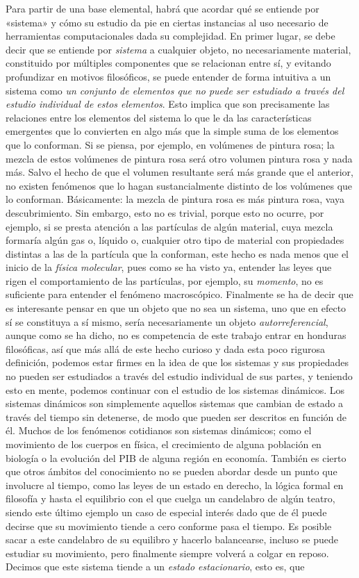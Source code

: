 Para partir de una base elemental, habrá que acordar qué se entiende por «sistema» y cómo su estudio da pie en ciertas instancias al uso necesario de herramientas computacionales dada su complejidad. En primer lugar, se debe decir que se entiende por \textit{sistema} a cualquier objeto, no necesariamente material, constituido por múltiples componentes que se relacionan entre sí, y evitando profundizar en motivos filosóficos, se puede entender de forma intuitiva a un sistema como \textit{un conjunto de elementos que no puede ser estudiado a través del estudio individual de estos elementos}. Esto implica que son precisamente las relaciones entre los elementos del sistema lo que le da las características emergentes que lo convierten en algo más que la simple suma de los elementos que lo conforman. Si se piensa, por ejemplo, en volúmenes de pintura rosa; la mezcla de estos volúmenes de pintura rosa será otro volumen pintura rosa y nada más. Salvo el hecho de que el volumen resultante será más grande que el anterior, no existen fenómenos que lo hagan sustancialmente distinto de los volúmenes que lo conforman. Básicamente: la mezcla de pintura rosa es más pintura rosa, vaya descubrimiento. Sin embargo, esto no es trivial, porque esto no ocurre, por ejemplo, si se presta atención a las partículas de algún material, cuya mezcla formaría algún gas o, líquido o, cualquier otro tipo de material con propiedades distintas a las de la partícula que la conforman, este hecho es nada menos que el inicio de la \textit{física molecular}, pues como se ha visto ya, entender las leyes que rigen el comportamiento de las partículas, por ejemplo, su \textit{momento}, no es suficiente para entender el fenómeno macroscópico. Finalmente se ha de decir que es interesante pensar en que un objeto que no sea un sistema, uno que en efecto sí se constituya a sí mismo, sería necesariamente un objeto \textit{autorreferencial}, aunque como se ha dicho, no es competencia de este trabajo entrar en honduras filosóficas, así que más allá de este hecho curioso y dada esta poco rigurosa definición, podemos estar firmes en la idea de que los sistemas y sus propiedades no pueden ser estudiados a través del estudio individual de sus partes, y teniendo esto en mente, podemos continuar con el estudio de los sistemas dinámicos. Los sistemas dinámicos son simplemente aquellos sistemas que cambian de estado a través del tiempo sin detenerse, de modo que pueden ser descritos en función de él. Muchos de los fenómenos cotidianos son sistemas dinámicos; como el movimiento de los cuerpos en física, el crecimiento de alguna población en biología o la evolución del PIB de alguna región en economía. También es cierto que otros ámbitos del conocimiento no se pueden abordar desde un punto que involucre al tiempo, como las leyes de un estado en derecho, la lógica formal en filosofía y hasta el equilibrio con el que cuelga un candelabro de algún teatro, siendo este último ejemplo un caso de especial interés dado que de él puede decirse que su movimiento tiende a cero conforme pasa el tiempo. Es posible sacar a este candelabro de su equilibro y hacerlo balancearse, incluso se puede estudiar su movimiento, pero finalmente siempre volverá a colgar en reposo. Decimos que este sistema tiende a un \textit{estado estacionario}, esto es, que 